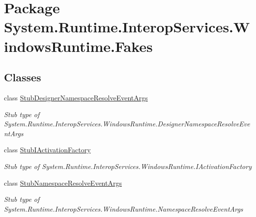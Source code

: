 \hypertarget{namespace_system_1_1_runtime_1_1_interop_services_1_1_windows_runtime_1_1_fakes}{\section{Package System.\-Runtime.\-Interop\-Services.\-Windows\-Runtime.\-Fakes}
\label{namespace_system_1_1_runtime_1_1_interop_services_1_1_windows_runtime_1_1_fakes}
}
\subsection*{Classes}
\begin{DoxyCompactItemize}
\item 
class \hyperlink{class_system_1_1_runtime_1_1_interop_services_1_1_windows_runtime_1_1_fakes_1_1_stub_designer_namespace_resolve_event_args}{Stub\-Designer\-Namespace\-Resolve\-Event\-Args}
\begin{DoxyCompactList}\small\item\em Stub type of System.\-Runtime.\-Interop\-Services.\-Windows\-Runtime.\-Designer\-Namespace\-Resolve\-Event\-Args\end{DoxyCompactList}\item 
class \hyperlink{class_system_1_1_runtime_1_1_interop_services_1_1_windows_runtime_1_1_fakes_1_1_stub_i_activation_factory}{Stub\-I\-Activation\-Factory}
\begin{DoxyCompactList}\small\item\em Stub type of System.\-Runtime.\-Interop\-Services.\-Windows\-Runtime.\-I\-Activation\-Factory\end{DoxyCompactList}\item 
class \hyperlink{class_system_1_1_runtime_1_1_interop_services_1_1_windows_runtime_1_1_fakes_1_1_stub_namespace_resolve_event_args}{Stub\-Namespace\-Resolve\-Event\-Args}
\begin{DoxyCompactList}\small\item\em Stub type of System.\-Runtime.\-Interop\-Services.\-Windows\-Runtime.\-Namespace\-Resolve\-Event\-Args\end{DoxyCompactList}\end{DoxyCompactItemize}
